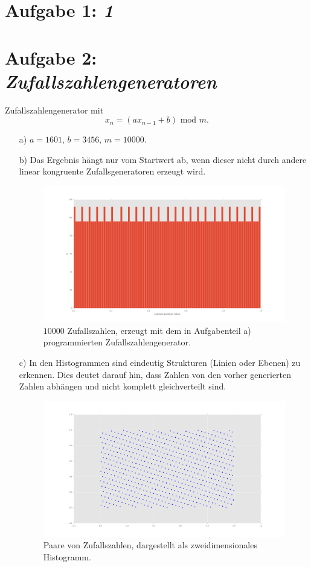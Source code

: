  
\section*{Aufgabe 1: \emph{1}}


\section*{Aufgabe 2: \emph{Zufallszahlengeneratoren}}

Zufallszahlengenerator mit
\begin{equation}
x_n=(ax_{n-1}+b) \text{ mod } m .
\end{equation}

\begin{itemize}


\item[a)] $a=1601$, $b=3456$, $m=10000$.
\item[b)] Das Ergebnis hängt nur vom Startwert ab, wenn dieser nicht durch andere linear kongruente Zufallsgeneratoren erzeugt wird.
\begin{figure}
\centering
\includegraphics[width=\textwidth]{linear_kongruent_random_numbers.png}
\caption{$10000$ Zufallszahlen, erzeugt mit dem in Aufgabenteil a) programmierten Zufallszahlengenerator.}
\label{fig:2b}
\end{figure}
\item[c)] In den Histogrammen sind eindeutig Strukturen (Linien oder Ebenen) zu erkennen. Dies deutet darauf hin, dass Zahlen von den vorher generierten Zahlen abhängen und nicht komplett gleichverteilt sind.
\begin{figure}
\centering
\includegraphics[width=\textwidth]{2dscatter.png}
\caption{Paare von Zufallszahlen, dargestellt als zweidimensionales Histogramm.}
\label{fig:2c1}
\end{figure}


\end{itemize}
